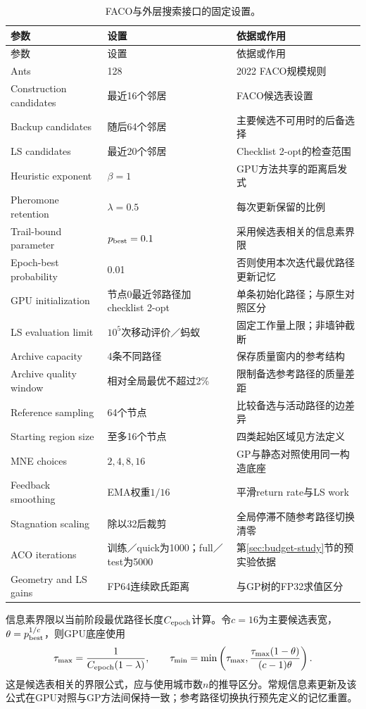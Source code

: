 \begin{longtable}{@{}L{34mm}L{36mm}L{46mm}@{}}
\caption{FACO与外层搜索接口的固定设置。}\label{tab:parameters}\\
\toprule 参数 & 设置 & 依据或作用\\ \midrule\endfirsthead
\toprule 参数 & 设置 & 依据或作用\\ \midrule\endhead
Ants & 128 & 2022 FACO规模规则\\
Construction candidates & 最近16个邻居 & FACO候选表设置\\
Backup candidates & 随后64个邻居 & 主要候选不可用时的后备选择\\
LS candidates & 最近20个邻居 & Checklist 2-opt的检查范围\\
Heuristic exponent & $\beta=1$ & GPU方法共享的距离启发式\\
Pheromone retention & $\lambda=0.5$ & 每次更新保留的比例\\
Trail-bound parameter & $p_{\rm best}=0.1$ & 采用候选表相关的信息素界限\\
Epoch-best probability & 0.01 & 否则使用本次迭代最优路径更新记忆\\
GPU initialization & 节点0最近邻路径加checklist 2-opt & 单条初始化路径；与原生对照区分\\
LS evaluation limit & $10^5$次移动评价／蚂蚁 & 固定工作量上限；非墙钟截断\\
Archive capacity & 4条不同路径 & 保存质量窗内的参考结构\\
Archive quality window & 相对全局最优不超过2\% & 限制备选参考路径的质量差距\\
Reference sampling & 64个节点 & 比较备选与活动路径的边差异\\
Starting region size & 至多16个节点 & 四类起始区域见方法定义\\
MNE choices & $2,4,8,16$ & GP与静态对照使用同一构造底座\\
Feedback smoothing & EMA权重$1/16$ & 平滑return rate与LS work\\
Stagnation scaling & 除以32后裁剪 & 全局停滞不随参考路径切换清零\\
ACO iterations & 训练／quick为1000；full／test为5000 & 第\ref{sec:budget-study}节的预实验依据\\
Geometry and LS gains & FP64连续欧氏距离 & 与GP树的FP32求值区分\\
\bottomrule
\end{longtable}

信息素界限以当前阶段最优路径长度$C_{\rm epoch}$计算。令$c=16$为主要候选表宽，$\theta=p_{\rm best}^{1/c}$，则GPU底座使用
\begin{equation}
 \tau_{\max}=\frac{1}{C_{\rm epoch}(1-\lambda)},\qquad
 \tau_{\min}=\min\left(\tau_{\max},\frac{\tau_{\max}(1-\theta)}{(c-1)\theta}\right).
\end{equation}
这是候选表相关的界限公式，应与使用城市数$n$的推导区分。常规信息素更新及该公式在GPU对照与GP方法间保持一致；参考路径切换执行预先定义的记忆重置。

